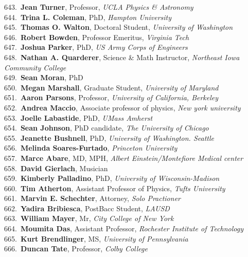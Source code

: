 643.~{\bf Jean Turner}, Professor, {\sl UCLA Physics \& Astronomy} \\
644.~{\bf Trina L. Coleman}, PhD, {\sl Hampton University } \\
645.~{\bf Thomas O. Walton}, Doctoral Student, {\sl University of Washington} \\
646.~{\bf Robert Bowden}, Professor Emeritus, {\sl Virginia Tech} \\
647.~{\bf Joshua Parker}, PhD, {\sl US Army Corps of Engineers} \\
648.~{\bf Nathan A. Quarderer}, Science \& Math Instructor, {\sl Northeast Iowa Community College} \\
649.~{\bf Sean Moran}, PhD \\
650.~{\bf Megan Marshall}, Graduate Student, {\sl University of Maryland} \\
651.~{\bf Aaron Parsons}, Professor, {\sl University of California, Berkeley} \\
652.~{\bf Andrea Maccio}, Associate professor of physics, {\sl New york university} \\
653.~{\bf Joelle Labastide}, PhD, {\sl UMass Amherst} \\
654.~{\bf Sean Johnson}, PhD candidate, {\sl The University of Chicago} \\
655.~{\bf Jeanette Bushnell}, PhD, {\sl University of Washington. Seattle} \\
656.~{\bf Melinda Soares-Furtado}, {\sl Princeton University} \\
657.~{\bf Marce Abare}, MD, MPH, {\sl Albert Einstein/Montefiore Medical center} \\
658.~{\bf David Gierlach}, Musician \\
659.~{\bf Kimberly Palladino}, PhD, {\sl University of Wisconsin-Madison} \\
660.~{\bf Tim Atherton}, Assistant Professor of Physics, {\sl Tufts University } \\
661.~{\bf Marvin E. Schechter}, Attorney, {\sl Solo Practioner} \\
662.~{\bf Yadira Bribiesca}, PostBacc Student, {\sl LAUSD} \\
663.~{\bf William Mayer}, Mr, {\sl City College of New York} \\
664.~{\bf Moumita Das}, Assistant Professor, {\sl Rochester Institute of Technology} \\
665.~{\bf Kurt Brendlinger}, MS, {\sl University of Pennsylvania} \\
666.~{\bf Duncan Tate}, Professor, {\sl Colby College} \\
